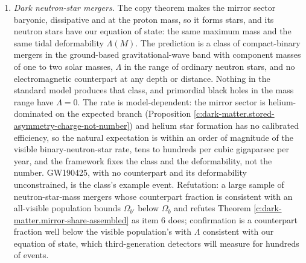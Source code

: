 \documentclass[11pt]{article}
\theoremstyle{definition}
\theoremstyle{plain}
\begin{document}
\begin{enumerate}
halo-like, and do not separate a disk-like part from the stars' mass-to-light ratio. The test therefore needs two analyses not yet made: a vertical-dynamics or phase-space-spiral analysis of Gaia data with a dark disk of that thickness, and a bulge model with a disk-like dark component. Until then the Galaxy test is registered, not run.
\item \emph{Dark neutron-star mergers.} The copy theorem makes the mirror sector baryonic, dissipative and at the proton mass, so it forms stars, and its neutron stars have our equation of state: the same maximum mass and the same tidal deformability $\Lambda(M)$. The prediction is a class of compact-binary mergers in the ground-based gravitational-wave band with component masses of one to two solar masses, $\Lambda$ in the range of ordinary neutron stars, and no electromagnetic counterpart at any depth or distance. Nothing in the standard model produces that class, and primordial black holes in the mass range have $\Lambda = 0$. The rate is model-dependent: the mirror sector is helium-dominated on the expected branch (Proposition \ref{c:dark-matter.stored-asymmetry-charge-not-number}) and helium star formation has no calibrated efficiency, so the natural expectation is within an order of magnitude of the visible binary-neutron-star rate, tens to hundreds per cubic gigaparsec per year, and the framework fixes the class and the deformability, not the number. GW190425, with no counterpart and its deformability unconstrained, is the class's example event. Refutation: a large sample of neutron-star-mass mergers whose counterpart fraction is consistent with an all-visible population bounds $\Omega_{b'}$ below $\Omega_{b}$ and refutes Theorem \ref{c:dark-matter.mirror-share-assembled} as item 6 does; confirmation is a counterpart fraction well below the visible population's with $\Lambda$ consistent with our equation of state, which third-generation detectors will measure for hundreds of events.
\end{enumerate}
\end{document}
